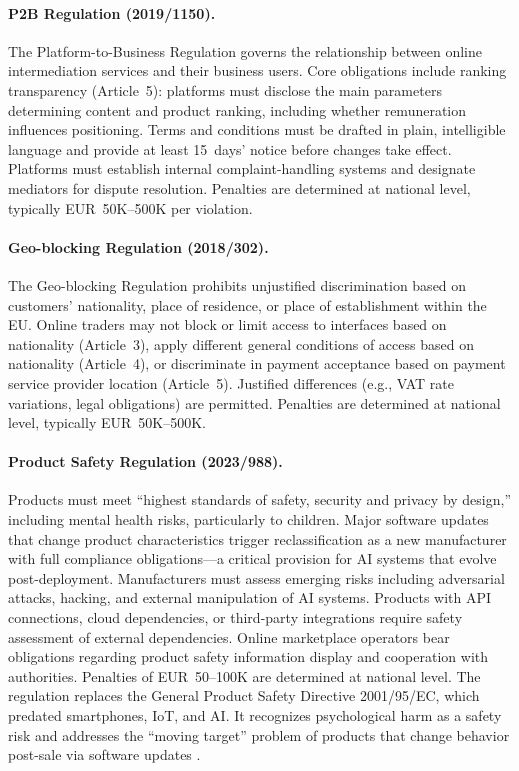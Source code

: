 \documentclass[11pt,a4paper]{article}
\begin{document}
\paragraph{P2B Regulation (2019/1150).}
The Platform-to-Business Regulation governs the relationship between online intermediation services and their business users. Core obligations include ranking transparency (Article~5): platforms must disclose the main parameters determining content and product ranking, including whether remuneration influences positioning. Terms and conditions must be drafted in plain, intelligible language and provide at least 15~days' notice before changes take effect. Platforms must establish internal complaint-handling systems and designate mediators for dispute resolution. Penalties are determined at national level, typically EUR~50K--500K per violation.

\paragraph{Geo-blocking Regulation (2018/302).}
The Geo-blocking Regulation prohibits unjustified discrimination based on customers' nationality, place of residence, or place of establishment within the EU. Online traders may not block or limit access to interfaces based on nationality (Article~3), apply different general conditions of access based on nationality (Article~4), or discriminate in payment acceptance based on payment service provider location (Article~5). Justified differences (e.g., VAT rate variations, legal obligations) are permitted. Penalties are determined at national level, typically EUR~50K--500K.

\paragraph{Product Safety Regulation (2023/988).}
Products must meet ``highest standards of safety, security and privacy by design,'' including mental health risks, particularly to children. Major software updates that change product characteristics trigger reclassification as a new manufacturer with full compliance obligations---a critical provision for AI systems that evolve post-deployment. Manufacturers must assess emerging risks including adversarial attacks, hacking, and external manipulation of AI systems. Products with API connections, cloud dependencies, or third-party integrations require safety assessment of external dependencies. Online marketplace operators bear obligations regarding product safety information display and cooperation with authorities. Penalties of EUR~50--100K are determined at national level. The regulation replaces the General Product Safety Directive 2001/95/EC, which predated smartphones, IoT, and AI. It recognizes psychological harm as a safety risk and addresses the ``moving target'' problem of products that change behavior post-sale via software updates \cite{productsafety}.
\end{document}
